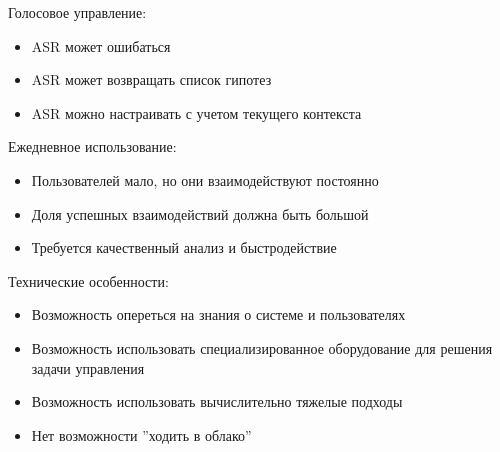 \documentclass[a4paper,12pt]{article}
\begin{document}
Голосовое управление:\\
\begin{itemize}
	\item ASR может ошибаться
	\item ASR может возвращать список гипотез
	\item ASR можно настраивать с учетом текущего контекста
\end{itemize}

Ежедневное использование:\\
\begin{itemize}
	\item Пользователей мало, но они взаимодействуют постоянно
	\item Доля успешных взаимодействий должна быть большой
	\item Требуется качественный анализ и быстродействие
\end{itemize}

Технические особенности:\\
\begin{itemize}
	\item Возможность опереться на знания о системе и пользователях
	\item Возможность использовать специализированное оборудование для решения задачи управления
	\item Возможность использовать вычислительно тяжелые подходы
	\item Нет возможности ''ходить в облако''
\end{itemize}
\end{document}
